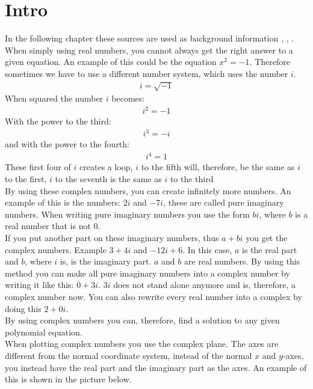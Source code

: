 \section{Intro}
In the following chapter these sources are used as background information \cite{complexpaul}, \cite{complexpurple}, \cite{complexnotebook}.
When simply using real numbers, you cannot always get the right answer to a given equation. An example of this could be the equation $x^2=-1$. Therefore sometimes we have to use a different number system, which uses the number $i$. 
\begin{align*}
i=\sqrt{-1}
\end{align*}
When squared the number $i$ becomes:
\begin{align*}
i^2=-1
\end{align*}
With the power to the third:
\begin{align*}
i^3=-i
\end{align*}
and with the power to the fourth:
\begin{align*}
i^4=1
\end{align*}
These first four of $i$ creates a loop, $i$ to the fifth will, therefore, be the same as $i$ to the first, $i$ to the seventh is the same as $i$ to the third \\
By using these complex numbers, you can create infinitely more numbers.  
An example of this is the numbers: $2i$ and $-7i$, these are called pure imaginary numbers. When writing pure imaginary numbers you use the form $bi$, where $b$ is a real number that is not $0$. \\
If you put another part on these imaginary numbers, thus $a+bi$ you get the complex numbers. Example $3+4i$ and $-12i+6$. In this case, $a$ is the real part and $b$, where $i$ is, is the imaginary part. $a$ and $b$ are real numbers. By using this method you can make all pure imaginary numbers into a complex number by writing it like this: $0+3i$. $3i$ does not stand alone anymore and is, therefore, a complex number now. You can also rewrite every real number into a complex by doing this $2+0i$. \\
By using complex numbers you can, therefore, find a solution to any given polynomial equation. \\ 
When plotting complex numbers you use the complex plane. The axes are different from the normal coordinate system, instead of the normal $x$ and $y$-axes, you instead have the real part and the imaginary part as the axes. An example of this is shown in the picture below.



